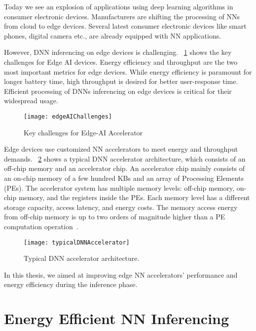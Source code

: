 Today we see an explosion of applications using deep learning algorithms in consumer electronic devices. Manufacturers are shifting the processing of NNs from cloud to edge devices.  Several latest consumer electronic devices like smart phones, digital camera etc., are already equipped with NN applications. 

However, DNN inferencing on edge devices is challenging. \figurename{~\ref{fig:edgeAIChallenges}} shows the key challenges for Edge AI devices. Energy efficiency and throughput are the two most important metrics for edge devices. While energy efficiency is paramount for longer battery time, high throughput is desired for better user-response time. Efficient processing of DNNs inferencing on edge devices is critical for their widespread usage. 

\begin{figure}[!htb]
	\centering
	\captionsetup{font=sf}
	\texttt{[image: edgeAIChallenges]}
	\caption{Key challenges for Edge-AI Accelerator}
	\label{fig:edgeAIChallenges}
\end{figure}
Edge devices use customized NN accelerators to meet energy and throughput demands. \figurename{~\ref{fig:typicalDNNAccelerator}} shows a typical DNN accelerator architecture, which consists of an off-chip memory and an accelerator chip. An accelerator chip mainly consists of an on-chip memory of a few hundred KBs and an array of Processing Elements (PEs). The accelerator system has multiple memory levels: off-chip memory, on-chip memory, and the registers inside the PEs. Each memory level has a different storage capacity, access latency, and energy costs. The memory access energy from off-chip memory is up to two orders of magnitude higher than a PE computation operation~\cite{Chen2016EyerissAS}. 
\begin{figure}[!htb]
	\centering
	\captionsetup{font=sf}
	\texttt{[image: typicalDNNAccelerator]}
    \caption{Typical DNN accelerator architecture.}
   	\label{fig:typicalDNNAccelerator}
    \vspace{1.0em}
\end{figure}

In this thesis, we aimed at improving edge NN accelerators' performance and energy efficiency during the inference phase.

\section{Energy Efficient NN Inferencing}
